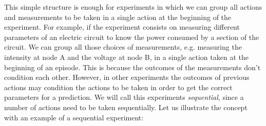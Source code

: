 \documentclass[11pt,a4paper,twoside]{report}
\newcommand{\+}{\textnormal{+} }
\theoremstyle{definition}
\numberwithin{equation}{chapter}
\begin{document}
This simple structure is enough for experiments in which we can group all
actions and measurements to be taken in a single action at the beginning of the
experiment. For example, if the experiment consists on measuring different
parameters of an electric circuit to know the power consumed by a section of the
circuit. We can group all those choices of measurements, e.g. measuring the
intensity at node A and the voltage at node B, in a single action taken at the
beginning of an episode. This is because the outcomes of the measurements don't
condition each other. However, in other experiments the outcomes of previous
actions may condition the actions to be taken in order to get the correct
parameters for a prediction. We will call this experiments \textit{sequential}, 
since a number of actions need to be taken sequentially.
Let us illustrate the concept with an example of a sequential experiment:
\end{document}
